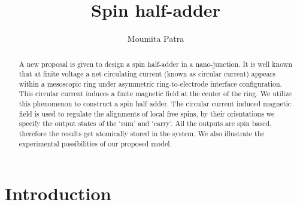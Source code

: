\documentclass[prb,aps,twocolumn,amsmath,amssymb,floatfix,superscriptaddress]{revtex4}
\begin{document}
\title{Spin half-adder}

\author{Moumita Patra}



\begin{abstract}

A new proposal is given to design a spin half-adder in a nano-junction. It is well known that
at finite voltage a net circulating current (known as circular current) appears within a mesoscopic
ring under asymmetric ring-to-electrode interface configuration. This circular current induces
a finite magnetic field at the center of the ring. We utilize this phenomenon to construct a spin
half adder. The circular current induced magnetic field is used to regulate the alignments of
local free spins, by their orientations we specify the output states of the `sum' and `carry'.
All the outputs are spin based, therefore the results get atomically stored in the system. We
also illustrate the experimental possibilities of our proposed model. 

\end{abstract}

\maketitle

\section{Introduction}
 
\end{document}
